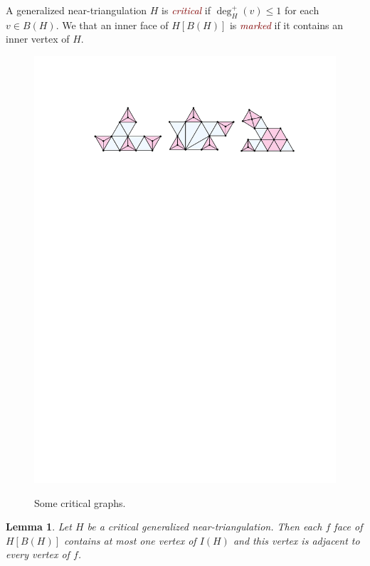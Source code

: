 \documentclass[12pt]{article}
\newtheorem{lem}{Lemma}
\newcommand{\defin}[1]{\emph{\textcolor{Maroon}{#1}}}
\theoremstyle{definition}
\begin{document}
A generalized near-triangulation $H$ is \defin{critical} if $\deg^+_H(v)\le 1$ for each $v\in B(H)$. We that an inner face of $H[B(H)]$ is \defin{marked} if it contains an inner vertex of $H$.

\begin{figure}[htbp]
    \begin{center}
        \includegraphics[page=1]{figs/critical} \\
    \end{center}
    \caption{Some critical graphs.}
    \label{critical_fig}
\end{figure}


\begin{lem}\label{critical_structure}
    Let $H$ be a critical generalized near-triangulation. Then each $f$ face of $H[B(H)]$ contains at most one vertex of $I(H)$ and this vertex is adjacent to every vertex of $f$.
\end{lem}
\end{document}

